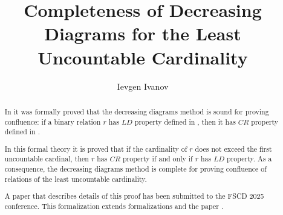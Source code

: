 \documentclass[11pt,a4paper]{article}
\begin{document}
\title{Completeness of Decreasing Diagrams for the Least Uncountable Cardinality}
\author{Ievgen Ivanov}
\date{}
\maketitle

\begin{abstract}
In \cite{Zankl2013-AFP} it was formally proved that the decreasing diagrams method \cite{Oostrom94} is sound for proving confluence: if a binary relation $r$ has $LD$ property defined in \cite{Zankl2013-AFP}, then it has $CR$ property defined in \cite{Sternagel2010-AFP}. 

In this formal theory it is proved that if the cardinality of $r$ does not exceed the first uncountable cardinal, then $r$ has $CR$ property if and only if $r$ has $LD$ property. As a consequence, the decreasing diagrams method is complete for proving confluence of relations of the least uncountable cardinality. 

A paper that describes details of this proof has been submitted to the FSCD 2025 conference. This formalization extends formalizations \cite{formal1,formal2,formal3,formal4} and the paper \cite{IWC24}.
\end{abstract}

\tableofcontents





\end{document}
